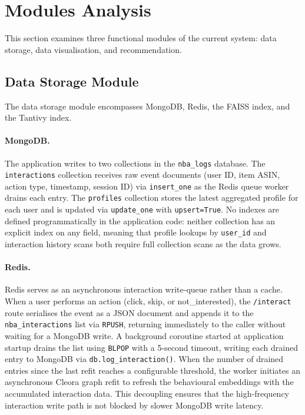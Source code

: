 \section{Modules Analysis}
\label{sec:modules_analysis}

This section examines three functional modules of the current system: data storage, data visualisation, and recommendation.

\subsection{Data Storage Module}
\label{sec:storage_analysis}

The data storage module encompasses MongoDB, Redis, the FAISS index, and the Tantivy index.

\paragraph{MongoDB.}
The application writes to two collections in the \texttt{nba\_logs} database.
The \texttt{interactions} collection receives raw event documents (user ID, item ASIN, action type, timestamp, session ID) via \texttt{insert\_one} as the Redis queue worker drains each entry.
The \texttt{profiles} collection stores the latest aggregated profile for each user and is updated via \texttt{update\_one} with \texttt{upsert=True}.
No indexes are defined programmatically in the application code: neither collection has an explicit index on any field, meaning that profile lookups by \texttt{user\_id} and interaction history scans both require full collection scans as the data grows.

\paragraph{Redis.}
Redis serves as an asynchronous interaction write-queue rather than a cache.
When a user performs an action (click, skip, or not\_interested), the \texttt{/interact} route serialises the event as a JSON document and appends it to the \texttt{nba\_interactions} list via \texttt{RPUSH}, returning immediately to the caller without waiting for a MongoDB write.
A background coroutine started at application startup drains the list using \texttt{BLPOP} with a 5-second timeout, writing each drained entry to MongoDB via \texttt{db.log\_interaction()}.
When the number of drained entries since the last refit reaches a configurable threshold, the worker initiates an asynchronous Cleora graph refit to refresh the behavioural embeddings with the accumulated interaction data.
This decoupling ensures that the high-frequency interaction write path is not blocked by slower MongoDB write latency.

